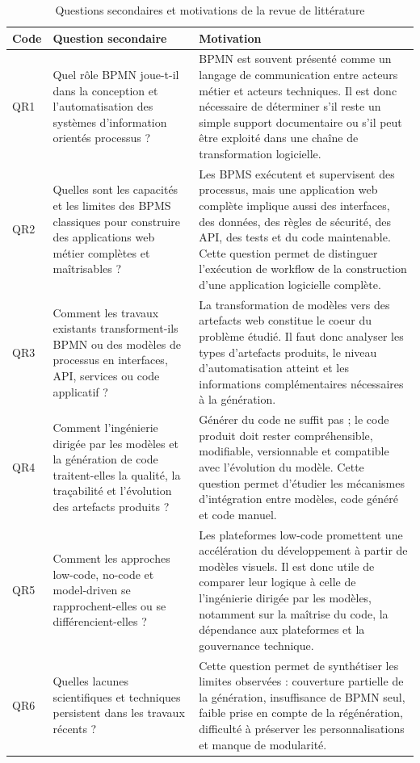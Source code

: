 \begin{table}[H]
\caption{Questions secondaires et motivations de la revue de littérature}
\label{tab:questions-recherche-motivations}
\centering
\footnotesize
\renewcommand{\arraystretch}{1.2}
\begin{tabular}{|p{1.3cm}|p{6.0cm}|p{6.0cm}|}
\hline
\textbf{Code} & \textbf{Question secondaire} & \textbf{Motivation} \\
\hline
QR1 & Quel rôle BPMN joue-t-il dans la conception et l'automatisation des systèmes d'information orientés processus ? & BPMN est souvent présenté comme un langage de communication entre acteurs métier et acteurs techniques. Il est donc nécessaire de déterminer s'il reste un simple support documentaire ou s'il peut être exploité dans une chaîne de transformation logicielle. \\
\hline
QR2 & Quelles sont les capacités et les limites des BPMS classiques pour construire des applications web métier complètes et maîtrisables ? & Les BPMS exécutent et supervisent des processus, mais une application web complète implique aussi des interfaces, des données, des règles de sécurité, des API, des tests et du code maintenable. Cette question permet de distinguer l'exécution de workflow de la construction d'une application logicielle complète. \\
\hline
QR3 & Comment les travaux existants transforment-ils BPMN ou des modèles de processus en interfaces, API, services ou code applicatif ? & La transformation de modèles vers des artefacts web constitue le coeur du problème étudié. Il faut donc analyser les types d'artefacts produits, le niveau d'automatisation atteint et les informations complémentaires nécessaires à la génération. \\
\hline
QR4 & Comment l'ingénierie dirigée par les modèles et la génération de code traitent-elles la qualité, la traçabilité et l'évolution des artefacts produits ? & Générer du code ne suffit pas ; le code produit doit rester compréhensible, modifiable, versionnable et compatible avec l'évolution du modèle. Cette question permet d'étudier les mécanismes d'intégration entre modèles, code généré et code manuel. \\
\hline
QR5 & Comment les approches low-code, no-code et model-driven se rapprochent-elles ou se différencient-elles ? & Les plateformes low-code promettent une accélération du développement à partir de modèles visuels. Il est donc utile de comparer leur logique à celle de l'ingénierie dirigée par les modèles, notamment sur la maîtrise du code, la dépendance aux plateformes et la gouvernance technique. \\
\hline
QR6 & Quelles lacunes scientifiques et techniques persistent dans les travaux récents ? & Cette question permet de synthétiser les limites observées : couverture partielle de la génération, insuffisance de BPMN seul, faible prise en compte de la régénération, difficulté à préserver les personnalisations et manque de modularité. \\
\hline
\end{tabular}
\end{table}

